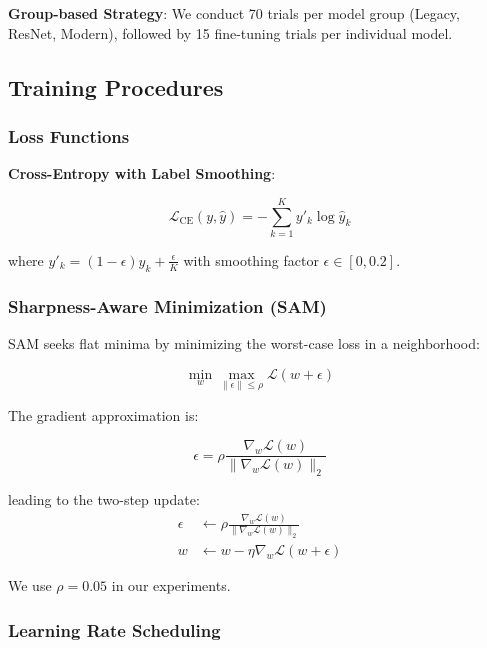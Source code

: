 \textbf{Group-based Strategy}: We conduct 70 trials per model group (Legacy, ResNet, Modern), followed by 15 fine-tuning trials per individual model.

\subsection{Training Procedures}

\subsubsection{Loss Functions}

\textbf{Cross-Entropy with Label Smoothing}:

\begin{equation}
\mathcal{L}_{\text{CE}}(y, \hat{y}) = -\sum_{k=1}^K y'_k \log \hat{y}_k
\end{equation}

where $y'_k = (1-\epsilon)y_k + \frac{\epsilon}{K}$ with smoothing factor $\epsilon \in [0, 0.2]$.

\subsubsection{Sharpness-Aware Minimization (SAM)}

SAM seeks flat minima by minimizing the worst-case loss in a neighborhood:

\begin{equation}
\min_w \max_{\|\epsilon\| \leq \rho} \mathcal{L}(w + \epsilon)
\end{equation}

The gradient approximation is:

\begin{equation}
\epsilon = \rho \frac{\nabla_w \mathcal{L}(w)}{\|\nabla_w \mathcal{L}(w)\|_2}
\end{equation}

leading to the two-step update:
\begin{align}
\epsilon &\leftarrow \rho \frac{\nabla_w \mathcal{L}(w)}{\|\nabla_w \mathcal{L}(w)\|_2} \\
w &\leftarrow w - \eta \nabla_w \mathcal{L}(w + \epsilon)
\end{align}

We use $\rho = 0.05$ in our experiments.

\subsubsection{Learning Rate Scheduling}

